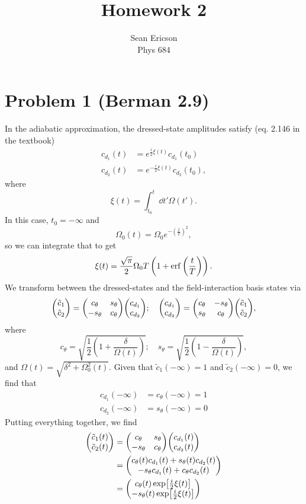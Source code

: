 \documentclass[12pt]{article}
\begin{document}
	
\title{Homework 2}
\author{Sean Ericson \\ Phys 684}
\maketitle

\section*{Problem 1 {\small (Berman 2.9)}}
In the adiabatic approximation, the dressed-state amplitudes satisfy (eq. 2.146 in the textbook)
\begin{align*}
    c_{d_1}(t) &= e^{\frac{i}{2}\xi(t)}c_{d_1}(t_0) \\
    c_{d_2}(t) &= e^{-\frac{i}{2}\xi(t)}c_{d_2}(t_0),
\end{align*}
where 
\[ \xi(t) = \int_{t_0}^t \dd t' \Omega(t'). \]
In this case, $t_0 = -\infty$ and 
\[ \Omega_0(t) = \Omega_0e^{-\left(\frac{t}{T}\right)^2}, \]
so we can integrate that to get
\[ \xi(t) = \frac{\sqrt{\pi}}{2}\Omega_0T\left(1 + \erf\left(\frac{t}{T}\right)\right). \]
We transform between the dressed-states and the field-interaction basis states via
\[ \mqty(\tilde{c}_1\\\tilde{c}_2) = \mqty(c_\theta&s_\theta\\-s_\theta&c_\theta)\mqty(c_{d_1}\\c_{d_2}); \quad \mqty(c_{d_1}\\c_{d_2}) = \mqty(c_\theta&-s_\theta\\s_\theta&c_\theta)\mqty(\tilde{c}_1\\\tilde{c}_2), \]
where
\[ c_\theta = \sqrt{\frac{1}{2}\left(1 + \frac{\delta}{\Omega(t)}\right)}; \quad s_\theta = \sqrt{\frac{1}{2}\left(1 - \frac{\delta}{\Omega(t)}\right)}, \]
and $\Omega(t) = \sqrt{\delta^2 + \Omega_0^2(t)}$. Given that $\tilde{c}_1(-\infty) = 1$ and $\tilde{c}_2(-\infty)=0$, we find that
\begin{align*}
    c_{d_1}(-\infty) &= c_\theta(-\infty) = 1 \\
    c_{d_2}(-\infty) &= s_\theta(-\infty) = 0
\end{align*}
Putting everything together, we find
\begin{align*}
    \mqty(\tilde{c}_1(t)\\\tilde{c}_2(t)) &= \mqty(c_\theta&s_\theta\\-s_\theta&c_\theta)\mqty(c_{d_1}(t)\\c_{d_2}(t)) \\
    &= \mqty(c_\theta(t)c_{d_1}(t) + s_\theta(t)c_{d_2}(t) \\ -s_\theta c_{d_1}(t) + c_\theta c_{d_2}(t)) \\
    &= \mqty(c_\theta(t)\exp[\frac{i}{2}\xi(t)] \\ -s_\theta(t)\exp[\frac{i}{2}\xi(t)] )
\end{align*}
\end{document}
